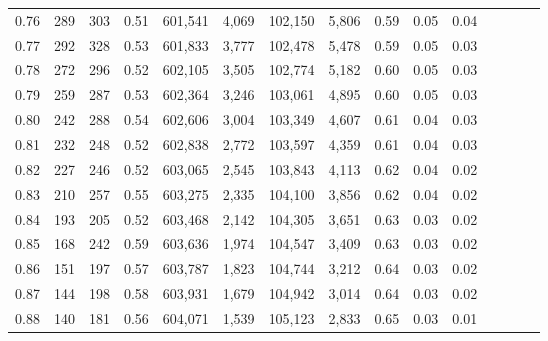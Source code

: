 \begin{tabular}{rrrcrrrrrrrrrrr}
0.76 &     289 &    303 &                                       0.51 &  601,541 &    4,069 &  102,150 &    5,806 &  0.59 &  0.05 &                         0.04 \\
0.77 &     292 &    328 &                                       0.53 &  601,833 &    3,777 &  102,478 &    5,478 &  0.59 &  0.05 &                         0.03 \\
0.78 &     272 &    296 &                                       0.52 &  602,105 &    3,505 &  102,774 &    5,182 &  0.60 &  0.05 &                         0.03 \\
0.79 &     259 &    287 &                                       0.53 &  602,364 &    3,246 &  103,061 &    4,895 &  0.60 &  0.05 &                         0.03 \\
0.80 &     242 &    288 &                                       0.54 &  602,606 &    3,004 &  103,349 &    4,607 &  0.61 &  0.04 &                         0.03 \\
0.81 &     232 &    248 &                                       0.52 &  602,838 &    2,772 &  103,597 &    4,359 &  0.61 &  0.04 &                         0.03 \\
0.82 &     227 &    246 &                                       0.52 &  603,065 &    2,545 &  103,843 &    4,113 &  0.62 &  0.04 &                         0.02 \\
0.83 &     210 &    257 &                                       0.55 &  603,275 &    2,335 &  104,100 &    3,856 &  0.62 &  0.04 &                         0.02 \\
0.84 &     193 &    205 &                                       0.52 &  603,468 &    2,142 &  104,305 &    3,651 &  0.63 &  0.03 &                         0.02 \\
0.85 &     168 &    242 &                                       0.59 &  603,636 &    1,974 &  104,547 &    3,409 &  0.63 &  0.03 &                         0.02 \\
0.86 &     151 &    197 &                                       0.57 &  603,787 &    1,823 &  104,744 &    3,212 &  0.64 &  0.03 &                         0.02 \\
0.87 &     144 &    198 &                                       0.58 &  603,931 &    1,679 &  104,942 &    3,014 &  0.64 &  0.03 &                         0.02 \\
0.88 &     140 &    181 &                                       0.56 &  604,071 &    1,539 &  105,123 &    2,833 &  0.65 &  0.03 &                         0.01 \\

\end{tabular}
